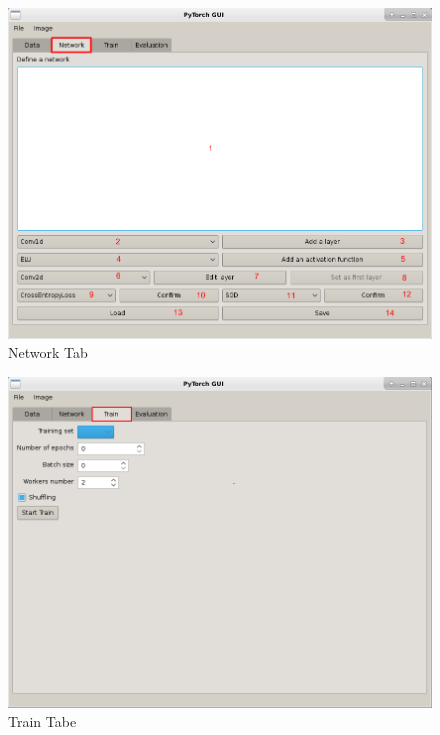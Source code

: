 \begin{figure}[!ht]
    \center
    \includegraphics[scale=0.5]{figures/app_screen_shoots/Network_tab.png}
    \caption{Network Tab}
\end{figure}

\begin{figure}[!ht]
    \center
    \includegraphics[scale=0.5]{figures/app_screen_shoots/Train_tab.png}
    \caption{Train Tabe}
\end{figure}

